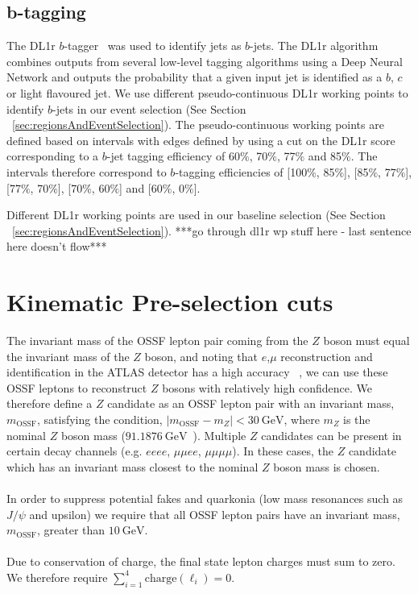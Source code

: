 \subsection{b-tagging}
The DL1r $b$-tagger~\cite{DL1r-paper} was used to identify jets as $b$-jets. The DL1r algorithm combines outputs from several low-level tagging algorithms using a Deep Neural Network and outputs the probability that a given input jet is identified as a $b$, $c$ or light flavoured jet. We use different pseudo-continuous DL1r working points to identify $b$-jets in our event selection (See Section ~\ref{sec:regionsAndEventSelection}). The pseudo-continuous working points are defined based on intervals with edges defined by using a cut on the DL1r score corresponding to a $b$-jet tagging efficiency of 60$\%$, 70$\%$, 77$\%$ and 85$\%$. The intervals therefore correspond to $b$-tagging efficiencies of [100$\%$, 85$\%$], [85$\%$, 77$\%$], [77$\%$, 70$\%$], [70$\%$, 60$\%$] and [60$\%$, 0$\%$].  

 Different DL1r working points are used in our baseline selection (See Section ~\ref{sec:regionsAndEventSelection}). ***go through dl1r wp stuff here - last sentence here doesn't flow***
\section{Kinematic Pre-selection cuts}
The invariant mass of the OSSF lepton pair coming from the $Z$ boson must equal the invariant mass of the $Z$ boson, and noting that $e$,$\mu$ reconstruction and identification in the ATLAS detector has a high accuracy ~\cite{}, we can use these OSSF leptons to reconstruct $Z$ bosons with relatively high confidence. We therefore define a $Z$ candidate as an OSSF lepton pair with an invariant mass, $m_{\text{OSSF}}$, satisfying the condition, $|m_{\text{OSSF}} - m_Z| <  \SI{30}{\GeV}$, where $m_Z$ is the nominal $Z$ boson mass ($\SI{91.1876}{\GeV}$~\cite{pdg}). Multiple $Z$ candidates can be present in certain decay channels (e.g. $eeee$, $\mu\mu ee$, $\mu \mu \mu \mu$). In these cases, the $Z$ candidate which has an invariant mass closest to the nominal $Z$ boson mass is chosen.\\\\
In order to suppress potential fakes and quarkonia (low mass resonances such as $J/\psi$ and upsilon) we require that all OSSF lepton pairs have an invariant mass, $m_{\text{OSSF}}$, greater than $\SI{10}{\GeV}$.\\\\
Due to conservation of charge, the final state lepton charges must sum to zero.\\ We therefore require $\displaystyle\sum_{i=1}^{4} \text{charge}(\ell_i) = 0$.

